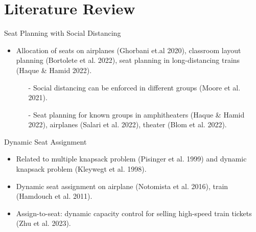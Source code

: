 
\section{Literature Review}
    \frame{\sectionpage}
    \begin{frame}{Seat Planning with Social Distancing}
      \begin{itemize}
        \item Allocation of seats on {\color{green} airplanes} (Ghorbani et.al 2020), {\color{green} classroom} layout planning (Bortolete et al. 2022), seat planning in long-distancing {\color{green} trains} (Haque \& Hamid 2022).
        \vspace*{0.5cm}

        \begin{itemize}
        \item[-] Social distancing can be enforced in different {\color{red}groups} (Moore et al. 2021).
        \vspace*{0.5cm}

        \item[-] Seat planning for known {\color{red}groups} in amphitheaters (Haque \& Hamid 2022), airplanes (Salari et al. 2022), {\color{green} theater} (Blom et al. 2022).   
        \end{itemize}
        
      \end{itemize}
      \end{frame}
      
      \begin{frame}{Dynamic Seat Assignment}
        \begin{itemize}
          \item Related to multiple knapsack problem (Pisinger et al. 1999) and dynamic knapsack problem (Kleywegt et al. 1998).
          \vspace*{0.5cm}
          \item Dynamic seat assignment on airplane (Notomista et al. 2016), train (Hamdouch et al. 2011).
          \vspace*{0.5cm}
          \item Assign-to-seat: dynamic capacity control for selling high-speed train
          tickets (Zhu et al. 2023). 
        \end{itemize}

      \end{frame}